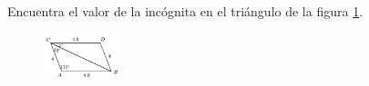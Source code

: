 \question[10]  Encuentra el valor de la incógnita en el triángulo de la figura \ref{fig:angle_triangle_25}.
\begin{figure}[H]
    \begin{center}
        \includegraphics[width=0.2\textwidth]{../images/angle_triangle_25.png}
    \end{center}
    \caption{}
    \label{fig:angle_triangle_25}
\end{figure}